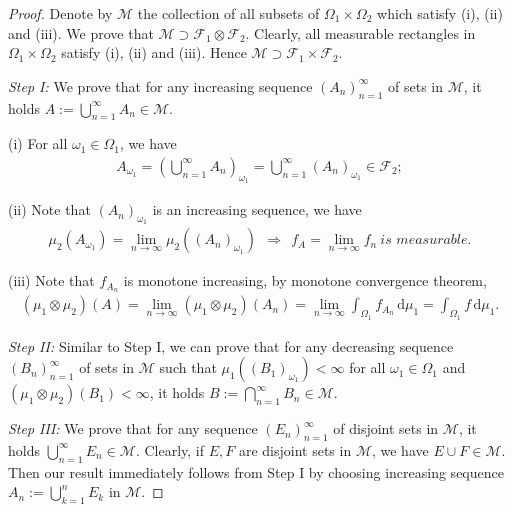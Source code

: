 \documentclass{article}
\numberwithin{equation}{section}
\renewcommand{\d}{\mathrm{d}}
\theoremstyle{plain}
\theoremstyle{definition}
\begin{document}
\begin{proof}
Denote by $\mathscr{M}$ the collection of all subsets of $\Omega_1\times\Omega_2$ which satisfy (i), (ii) and (iii). We prove that $\mathscr{M}\supset\mathscr{F}_1\otimes\mathscr{F}_2$. Clearly, all measurable rectangles in $\Omega_1\times\Omega_2$ satisfy (i), (ii) and (iii). Hence $\mathscr{M}\supset\mathscr{F}_1\times\mathscr{F}_2$. \vspace{0.1cm}

\item\textit{Step I:} We prove that for any increasing sequence $(A_n)_{n=1}^\infty$ of sets in $\mathscr{M}$, it holds $A:=\bigcup_{n=1}^\infty A_n\in\mathscr{M}$.

(i) For all $\omega_1\in\Omega_1$, we have
\begin{align*}
	A_{\omega_1}=\left(\bigcup_{n=1}^\infty A_n\right)_{\omega_1} = \bigcup_{n=1}^\infty (A_n)_{\omega_1}\in\mathscr{F}_2;
\end{align*}

(ii) Note that $(A_n)_{\omega_1}$ is an increasing sequence, we have
\begin{align*}
	\mu_2(A_{\omega_1}) = \lim_{n\to\infty}\mu_2\left((A_n)_{\omega_1}\right)\ \ \Rightarrow\ \ f_A=\lim_{n\to\infty} f_n\ \textit{is measurable}.
\end{align*}

(iii) Note that $f_{A_n}$ is monotone increasing, by monotone convergence theorem,
\begin{align*}
	(\mu_1\otimes\mu_2)(A) = \lim_{n\to\infty}(\mu_1\otimes\mu_2)(A_n) = \lim_{n\to\infty}\int_{\Omega_1}f_{A_n}\,\d \mu_1 = \int_{\Omega_1} f\,\d \mu_1.
\end{align*}

\item\textit{Step II:} Similar to Step I, we can prove that for any decreasing sequence $(B_n)_{n=1}^\infty$ of sets in $\mathscr{M}$ such that $\mu_1((B_1)_{\omega_1})<\infty$ for all $\omega_1\in\Omega_1$ and $(\mu_1\otimes\mu_2)(B_1)<\infty$, it holds  $B:=\bigcap_{n=1}^\infty B_n\in\mathscr{M}$.\vspace{0.1cm}

\item\textit{Step III:} We prove that for any sequence $(E_n)_{n=1}^\infty$ of disjoint sets in $\mathscr{M}$, it holds $\bigcup_{n=1}^\infty E_n\in\mathscr{M}$. Clearly, if $E,F$ are disjoint sets in $\mathscr{M}$, we have $E\cup F\in\mathscr{M}$. Then our result immediately follows from Step I by choosing increasing sequence $A_n:=\bigcup_{k=1}^n E_k$ in $\mathscr{M}$. \vspace{0.1cm}


\end{proof}
\end{document}
